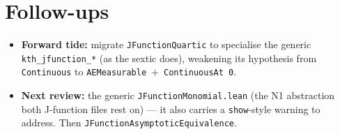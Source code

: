 \documentclass[11pt]{article}
\begin{document}
\section{Follow-ups}
\begin{itemize}[noitemsep]
  \item \textbf{Forward tide:} migrate \texttt{JFunctionQuartic} to specialise the generic
    \texttt{kth\_jfunction\_*} (as the sextic does), weakening its hypothesis from \texttt{Continuous} to
    \texttt{AEMeasurable}~$+$~\texttt{ContinuousAt 0}.
  \item \textbf{Next review:} the generic \texttt{JFunctionMonomial.lean} (the N1 abstraction both J-function
    files rest on) --- it also carries a \texttt{show}-style warning to address. Then
    \texttt{JFunctionAsymptoticEquivalence}.
\end{itemize}
\end{document}
